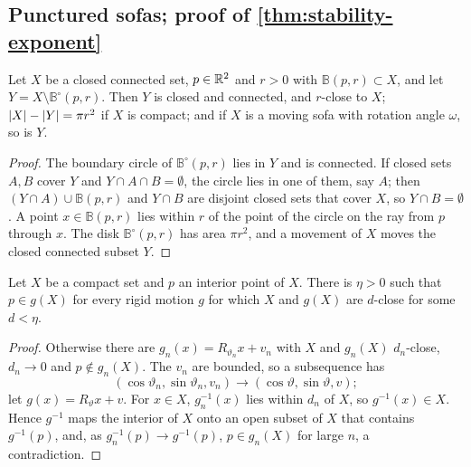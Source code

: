 \subsection{Punctured sofas; proof of
\texorpdfstring{\cref{thm:stability-exponent}}{the optimality of the
exponent}}\label{sec:stab-puncture}

\begin{lemma}\label{lem:stab-puncture}
Let $X$ be a closed connected set, $p\in\mathbb{R}^2$ and $r>0$ with
$\mathbb B(p,r)\subset X$, and let $Y=X\setminus\mathbb B^\circ(p,r)$. Then
$Y$ is closed and connected, and $r$-close to $X$; $\lvert X\rvert-\lvert Y\rvert=\pi r^2$ if
$X$ is compact; and if $X$ is a moving sofa with rotation angle $\omega$, so is
$Y$.
\end{lemma}

\begin{proof}
The boundary circle of $\mathbb B^\circ(p,r)$ lies in $Y$ and is connected. If
closed sets $A,B$ cover $Y$ and $Y\cap A\cap B=\emptyset$, the circle lies in
one of them, say $A$; then $(Y\cap A)\cup\mathbb B(p,r)$ and $Y\cap B$ are
disjoint closed sets that cover $X$, so $Y\cap B=\emptyset$. A point
$x\in\mathbb B(p,r)$ lies within $r$ of the point of the circle on the ray
from $p$ through $x$. The disk $\mathbb B^\circ(p,r)$ has area $\pi r^2$, and a
movement of $X$ moves the closed connected subset $Y$.
\end{proof}

\begin{lemma}\label{lem:stab-rigid}
Let $X$ be a compact set and $p$ an interior point of $X$. There is $\eta>0$
such that $p\in g(X)$ for every rigid motion $g$ for which $X$ and $g(X)$ are
$d$-close for some $d<\eta$.
\end{lemma}

\begin{proof}
Otherwise there are $g_n(x)=R_{\vartheta_n}x+v_n$ with $X$ and $g_n(X)$
$d_n$-close, $d_n\to0$ and $p\notin g_n(X)$. The $v_n$ are bounded, so a
subsequence has
\[
  (\cos\vartheta_n,\sin\vartheta_n,v_n)\to(\cos\vartheta,\sin\vartheta,v);
\]
let $g(x)=R_\vartheta x+v$. For $x\in X$, $g_n^{-1}(x)$ lies within $d_n$ of
$X$, so $g^{-1}(x)\in X$. Hence $g^{-1}$ maps the interior of $X$ onto an open
subset of $X$ that contains $g^{-1}(p)$, and, as $g_n^{-1}(p)\to g^{-1}(p)$,
$p\in g_n(X)$ for large $n$, a contradiction.
\end{proof}

